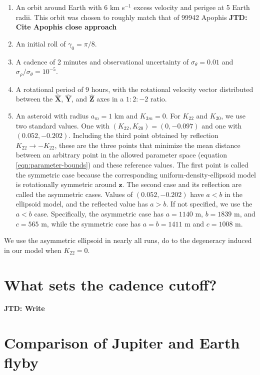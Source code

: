 \documentclass[fleqn,usenatbib]{mnras}
\newcommand{\jtd}[1]{ {\bf{\color{red} JTD: #1}} }
\newcommand{\unit}[1]{\bm{\hat{#1}}}
\begin{document}
\begin{enumerate}
  \item An orbit around Earth with $6$ km s$^{-1}$ excess velocity and perigee at 5 Earth radii. This orbit was chosen to roughly match that of 99942 Apophis \jtd{Cite Apophis close approach}
  \item An initial roll of $\gamma_0=\pi/8$.
  \item A cadence of 2 minutes and observational uncertainty of $\sigma_\theta = 0.01$ and $\sigma_\rho / \sigma_\theta = 10^{-5}$.
  \item A rotational period of 9 hours, with the rotational velocity vector distributed between the $\unit X$, $\unit Y$, and $\unit Z$ axes in a $1:2:-2$ ratio.
  \item An asteroid with radius $a_m = 1$ km and $K_{3m}=0$. For $K_{22}$ and $K_{20}$, we use two standard values. One with $(K_{22}, K_{20}) = (0, -0.097)$ and one with $(0.052, -0.202)$. Including the third point obtained by reflection $K_{22}\rightarrow -K_{22}$, these are the three points that minimize the mean distance between an arbitrary point in the allowed parameter space (equation \ref{eqn:parameter-bounds}) and these reference values. The first point is called the symmetric case because the corresponding uniform-density-ellipsoid model is rotationally symmetric around $\unit z$. The second case and its reflection are called the asymmetric cases. Values of $(0.052, -0.202)$ have $a < b$ in the ellipsoid model, and the reflected value has $a > b$. If not specified, we use the $a < b$ case. Specifically, the asymmetric case has $a=1140$ m, $b=1839$ m, and $c=565$ m, while the symmetric case has $a=b=1411$ m and $c=1008$ m.
\end{enumerate}

We use the asymmetric ellipsoid in nearly all runs, do to the degeneracy induced in our model when $K_{22} = 0$.


\section{What sets the cadence cutoff?}
\label{app:cadence-tests}

\jtd{Write}



\section{Comparison of Jupiter and Earth flyby}
\label{app:jupiter-earth}
\end{document}
